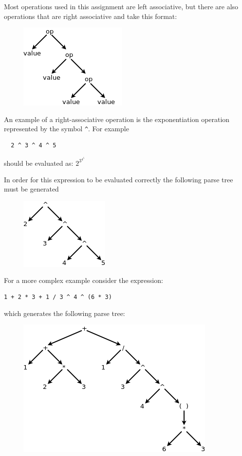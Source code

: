 \documentclass{article}
\newcommand{\code}[1]{\texttt{\textmd{#1}}}
\begin{document}
Most operations used in this assignment are left associative, but there are also operations that
are right associative and take this format:
\begin{figure}[H]
  \centering
  \includegraphics{static/right-assoc-gen.png}
\end{figure}

An example of a right-associative operation is the exponentiation operation represented by the
symbol \code{\textasciicircum}. For example
\begin{lstlisting}
  2 ^ 3 ^ 4 ^ 5
\end{lstlisting}

should be evaluated as:
\begin{math}
  2 ^ {\displaystyle 3 ^ {\displaystyle 4 ^ {\displaystyle 5 }}}
\end{math}

In order for this expression to be evaluated correctly the following parse tree must be generated
\begin{figure}[H]
  \centering
  \includegraphics{static/right-assoc-pow.png}
\end{figure}

For a more complex example consider the expression:
\begin{lstlisting}
1 + 2 * 3 + 1 / 3 ^ 4 ^ (6 * 3)
\end{lstlisting}

which generates the following parse tree:
\begin{figure}[H]
  \centering
  \includegraphics{static/assoc-example.png}
\end{figure}
\end{document}

